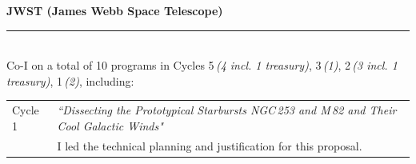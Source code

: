 \documentclass[11pt]{article}
\makeatletter
\def\vhrulefill#1{\leavevmode\leaders\hrule \@height #1\hfill \kern\z@}
\newcommand{\subsectionname}[1]{{\large\bf #1 \vhrulefill{0.5pt}}}
\makeatother
\begin{document}
\subsectionname{JWST \textmd{\small (James Webb Space Telescope)}}\\
Co-I on a total of  10 programs in Cycles 5\,{\em (4 incl. 1 treasury)}, 3\,{\em(1)}, 2\,{\em(3 incl. 1 treasury)}, 1\,{\em(2)}, including:
\vspace{-18pt}
\begin{longtable}{p{}p{}}
Cycle 1 &  \textit{``Dissecting the Prototypical Starbursts NGC\,253 and M\,82 and Their Cool Galactic Winds"}\\
& {\small I led the technical planning and justification for this proposal.}
\end{longtable}
\vspace{-18pt}


\end{document}
